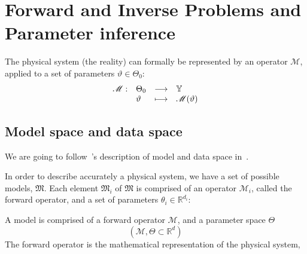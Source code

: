\documentclass[../../Main_ManuscritThese.tex]{subfiles}
\begin{document}
\pagestyle{introStyle}


\setcounter{chapter}{0}
\renewcommand{\thechapter}{\arabic{chapter}}%
\label{chap:inverse_problem}
\pagestyle{contentStyle}
\minitoc
\newpage


\section{Forward and Inverse Problems and Parameter inference}
The physical system (the reality) can formally be represented by an operator $\mathscr{M}$, applied to a set of parameters $\vartheta \in \Theta_0$:
\begin{equation*}
  \begin{array}{llll}
    \mathscr{M} :& \Theta_0 &\longrightarrow& \mathbb{Y} \\
                 & \vartheta & \longmapsto& \mathscr{M}(\vartheta)
    \end{array}
\end{equation*}

\subsection{Model space and data space}
\label{sec:model_space_data_space}
We are going to follow~\citeauthor{tarantola_inverse_2005}'s description of model and data space in~\cite{tarantola_inverse_2005}.

In order to describe accurately a physical system, we have a set of possible models, $\mathfrak{M}$. Each element $\mathfrak{M}_i$ of $\mathfrak{M}$ is comprised of an operator $\mathcal{M}_i$, called the forward operator, and a set of parameters $\theta_i \in \mathbb{R}^{d_i}$:
\\
\begin{envDef}[Model]
  A model is comprised of a forward operator $\mathcal{M}$, and a parameter space $\Theta$
  \begin{equation}
  (\mathcal{M}, \Theta \subset \mathbb{R}^{d})
\end{equation}
The forward operator is the mathematical representation of the physical system, 
\end{envDef}
\end{document}
